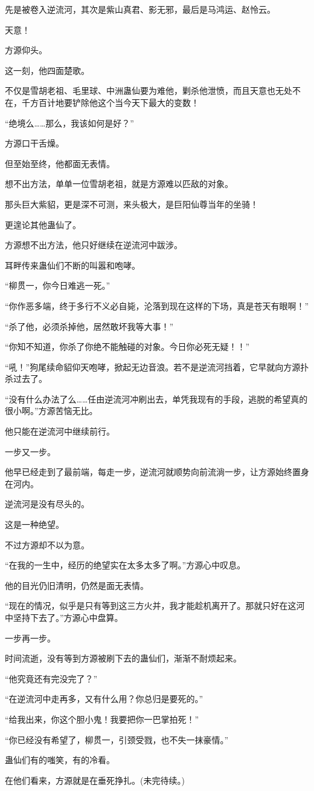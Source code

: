 \begin{this_body}
先是被卷入逆流河，其次是紫山真君、影无邪，最后是马鸿运、赵怜云。

天意！

方源仰头。

这一刻，他四面楚歌。

不仅是雪胡老祖、毛里球、中洲蛊仙要为难他，剿杀他泄愤，而且天意也无处不在，千方百计地要铲除他这个当今天下最大的变数！

“绝境么……那么，我该如何是好？”

方源口干舌燥。

但至始至终，他都面无表情。

想不出方法，单单一位雪胡老祖，就是方源难以匹敌的对象。

那头巨大紫貂，更是深不可测，来头极大，是巨阳仙尊当年的坐骑！

更遑论其他蛊仙了。

方源想不出方法，他只好继续在逆流河中跋涉。

耳畔传来蛊仙们不断的叫嚣和咆哮。

“柳贯一，你今日难逃一死。”

“你作恶多端，终于多行不义必自毙，沦落到现在这样的下场，真是苍天有眼啊！”

“杀了他，必须杀掉他，居然敢坏我等大事！”

“你知不知道，你杀了你绝不能触碰的对象。今日你必死无疑！！”

“吼！”狗尾续命貂仰天咆哮，掀起无边音浪。若不是逆流河挡着，它早就向方源扑杀过去了。

“没有什么办法了么……任由逆流河冲刷出去，单凭我现有的手段，逃脱的希望真的很小啊。”方源苦恼无比。

他只能在逆流河中继续前行。

一步又一步。

他早已经走到了最前端，每走一步，逆流河就顺势向前流淌一步，让方源始终置身在河内。

逆流河是没有尽头的。

这是一种绝望。

不过方源却不以为意。

“在我的一生中，经历的绝望实在太多太多了啊。”方源心中叹息。

他的目光仍旧清明，仍然是面无表情。

“现在的情况，似乎是只有等到这三方火并，我才能趁机离开了。那就只好在这河中坚持下去了。”方源心中盘算。

一步再一步。

时间流逝，没有等到方源被刷下去的蛊仙们，渐渐不耐烦起来。

“他究竟还有完没完了？”

“在逆流河中走再多，又有什么用？你总归是要死的。”

“给我出来，你这个胆小鬼！我要把你一巴掌拍死！”

“你已经没有希望了，柳贯一，引颈受戮，也不失一抹豪情。”

蛊仙们有的嗤笑，有的冷看。

在他们看来，方源就是在垂死挣扎。(未完待续。)

\end{this_body}

